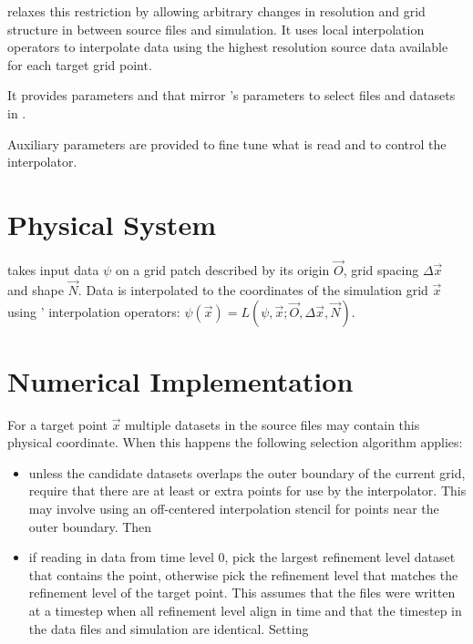  relaxes this restriction by allowing arbitrary changes
in resolution and grid structure in between source files and simulation. It
uses  local interpolation operators
 to interpolate data using the highest
resolution source data available for each target grid point.

It provides parameters  and
 that mirror 's parameters to select
files and datasets in .

Auxiliary parameters are provided to fine tune what is read and to control the
interpolator.

\section{Physical System}
 takes input data $\psi$ on a grid patch described by
its origin $\vec O$, grid spacing $\Delta \vec x$ and shape $\vec N$. Data is
interpolated to the coordinates of the simulation grid $\vec x$ using
' interpolation operators: $\psi(\vec x) = L(\psi, \vec x; \vec
O, \Delta \vec x, \vec N)$.

\section{Numerical Implementation}
For a target point $\vec x$ multiple datasets in the source files may contain
this physical coordinate. When this happens the following selection
algorithm applies:

\begin{itemize}
\item unless the candidate datasets overlaps the outer boundary of the
current grid, require that there are at least  or
 extra points for use by the interpolator. This
may involve using an off-centered interpolation stencil for points near the
outer boundary. Then
\item if reading in data from time level 0, pick the largest refinement level
dataset that contains the point, otherwise pick the refinement level that
matches the refinement level of the target point. This assumes that the files
were written at a timestep when all refinement level align in time and that
the timestep in the data files and simulation are identical. Setting 
\end{itemize}


